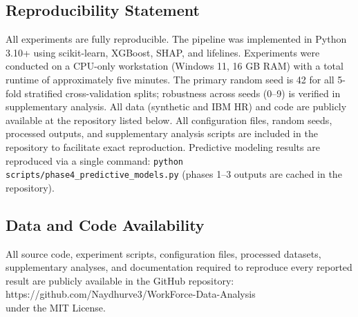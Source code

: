\documentclass[conference]{IEEEtran}
\begin{document}
\subsection*{Reproducibility Statement}

All experiments are fully reproducible. The pipeline was implemented in Python 3.10+ using scikit-learn, XGBoost, SHAP, and lifelines. Experiments were conducted on a CPU-only workstation (Windows 11, 16 GB RAM) with a total runtime of approximately five minutes. The primary random seed is 42 for all 5-fold stratified cross-validation splits; robustness across seeds (0--9) is verified in supplementary analysis. All data (synthetic and IBM HR) and code are publicly available at the repository listed below. All configuration files, random seeds, processed outputs, and supplementary analysis scripts are included in the repository to facilitate exact reproduction. Predictive modeling results are reproduced via a single command: \texttt{python scripts/phase4\_predictive\_models.py} (phases 1--3 outputs are cached in the repository).

\subsection*{Data and Code Availability}

All source code, experiment scripts, configuration files, processed datasets, supplementary analyses, and documentation required to reproduce every reported result are publicly available in the GitHub repository:\\
\small https://github.com/Naydhurve3/WorkForce-Data-Analysis\\
under the MIT License.



\end{document}
